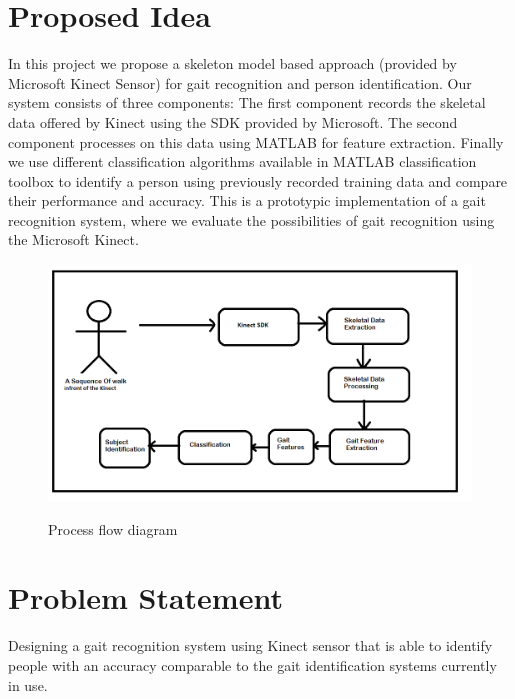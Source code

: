 \section{Proposed Idea} \label{Proposed Idea}
\noindent In this project we propose a skeleton model based approach (provided by Microsoft Kinect Sensor) for gait recognition and person identification. Our system consists of three components: The first component records the skeletal data offered by Kinect using the SDK provided by Microsoft. The second component processes on this data using MATLAB for feature extraction. Finally we use different classification algorithms available in MATLAB classification toolbox to identify a person using previously recorded training data and compare their performance and accuracy. This is a prototypic implementation of a gait recognition system, where we evaluate the possibilities of gait recognition using the Microsoft Kinect.


\begin{figure}[h]
\centering 
{\includegraphics[scale=0.55]{Figprocessflow.png}}
\caption{Process flow diagram}
\end{figure}

\section{Problem Statement} \label{Problem Statement}
\noindent Designing a gait recognition system using Kinect sensor that is able to identify people with an accuracy comparable to the gait identification systems currently in use.